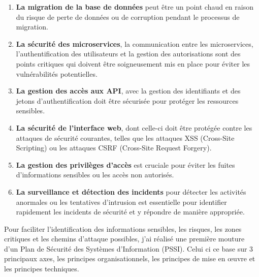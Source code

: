 \documentclass[a4paper, 11pt]{report}
\begin{document}
  \begin{enumerate}
    \item \textbf{La migration de la base de données} peut être un point chaud en raison du risque de perte de données ou de corruption pendant le processus de migration.
    \item \textbf{La sécurité des microservices}, la communication entre les microservices, l'authentification des utilisateurs et la gestion des autorisations  sont des points critiques qui doivent être soigneusement mis en place pour éviter les vulnérabilités potentielles.
    \item \textbf{La gestion des accès aux API}, avec la gestion des identifiants et des jetons d'authentification doit être sécurisée pour protéger les ressources sensibles.
    \item \textbf{La sécurité de l'interface web}, dont celle-ci doit être protégée contre les attaques de sécurité courantes, telles que les attaques XSS (Cross-Site Scripting) ou les attaques CSRF (Cross-Site Request Forgery).
    \item \textbf{La gestion des privilèges d'accès} est cruciale pour éviter les fuites d'informations sensibles ou les accès non autorisés.
    \item \textbf{La surveillance et détection des incidents} pour détecter les activités anormales ou les tentatives d'intrusion est essentielle pour identifier rapidement les incidents de sécurité et y répondre de manière appropriée.
  \end{enumerate}
  Pour faciliter l'identification des informations sensibles, les risques, les zones critiques et les chemins d’attaque possibles, j'ai réalisé une première mouture d'un Plan de Sécurité des Systèmes d'Information (PSSI).
  Celui ci ce base sur 3 principaux axes, les principes organisationnels, les principes de mise en œuvre et les principes techniques.
\end{document}
